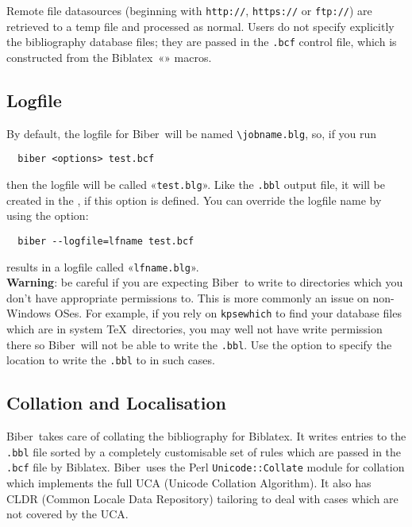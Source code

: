 \documentclass{ltxdockit}
\newcommand*{\biber}{Biber\xspace}
\newcommand*{\biblatex}{Biblatex\xspace}
\begin{document}
\noindent Remote file datasources (beginning with \verb+http://+, \verb+https://+ or
\verb+ftp://+) are retrieved to a temp file and processed as normal. Users
do not specify explicitly the bibliography database files; they are passed
in the \verb+.bcf+ control file, which is constructed from the
\biblatex\ «\verb++» macros.

\subsection{Logfile}

By default, the logfile for \biber\ will be named \verb+\jobname.blg+,
so, if you run

\begin{verbatim}
  biber <options> test.bcf
\end{verbatim}

\noindent then the logfile will be called «\verb+test.blg+». Like the
\verb+.bbl+ output file, it will be created in the
, if this option is defined. You can
override the logfile name by using the  option:

\begin{verbatim}
  biber --logfile=lfname test.bcf
\end{verbatim}

\noindent results in a logfile called «\verb+lfname.blg+».\\

\noindent \textbf{Warning}: be careful if you are expecting \biber\ to
write to directories which you don't have appropriate permissions to. This
is more commonly an issue on non-Windows OSes. For example, if you rely on
\verb+kpsewhich+ to find your database files which are in system \TeX\
directories, you may well not have write permission there so \biber\
will not be able to write the \verb+.bbl+. Use the 
option to specify the location to write the \verb+.bbl+ to in such cases.

\subsection{Collation and Localisation}\label{coll}

\biber\ takes care of collating the bibliography for
\biblatex. It writes entries to the \verb+.bbl+ file sorted by a
completely customisable set of rules which are passed in the
\verb+.bcf+ file by \biblatex. \biber\ uses the Perl
\verb+Unicode::Collate+ module for collation which implements the full UCA
(Unicode Collation Algorithm). It also has CLDR (Common Locale Data
Repository) tailoring to deal with cases which are not covered by the
UCA.
\end{document}
